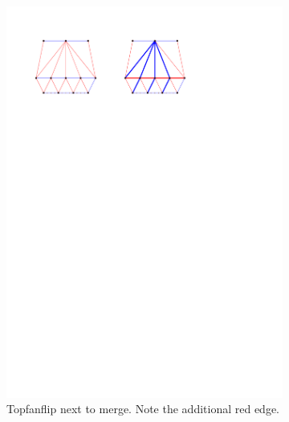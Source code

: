 \begin{figure}[!b]
\begin{subfigure}[b]{0.45 \textwidth}
        \includegraphics[width =\textwidth]{topFanFlips/img/mergeend}
        \caption{Topfanflip next to merge. Note the additional red edge.}
        \label{fig:fanflip:mergeLastVertex}
    \end{subfigure}
    \centering
    \begin{subfigure}[b]{0.45 \textwidth}

\end{subfigure}
\end{figure}
